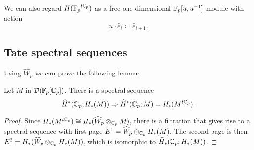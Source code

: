 \begin{remark}
	We can also regard \(H({\mathbb{F}_p}^{t\mathbb{C}_p})\) as a free one-dimensional \({\mathbb{F}_p}[u,u^{-1}]\)-module with action
	\[
	u \cdot \widehat e_i \coloneqq \widehat e_{i+1}.
	\]
\end{remark}

\subsection{Tate spectral sequences}

Using \(\widehat W_p\) we can prove the following lemma:

\begin{lemma}\label{spectral_seq}
	Let \(M\) in \(\mathcal D({\mathbb{F}_p}[\mathbb{C}_p])\).
	There is a spectral sequence
	\[
	\widehat H^*(\mathbb{C}_p;H_*(M)) \Rightarrow \widehat H^*(\mathbb{C}_p;M) = H_*(M^{t\mathbb{C}_p}).
	\]
\end{lemma}

\begin{proof}
	Since \(H_*(M^{t\mathbb{C}_p}) \cong H_*(\widehat W_p \otimes_{\mathbb{C}_p} M)\), there is a filtration that gives rise to a spectral sequence with first page \(E^1 = \widehat W_p \otimes_{\mathbb{C}_p}H_*(M)\).
	The second page is then \(E^2 = H_*(\widehat W_p \otimes_{\mathbb{C}_p}H_*(M))\), which is isomorphic to \(\widehat H_*(\mathbb{C}_p;H_*(M))\).\qedhere
\end{proof}



%

